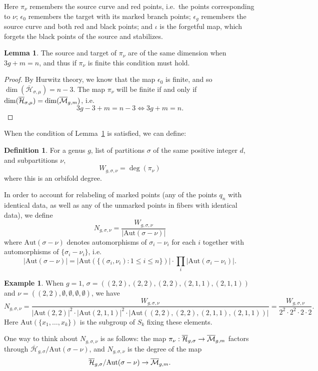 \documentclass[thesis]{thesis-umich}           %
\newcommand{\Aut}{\text{Aut}}
\newcommand{\Hb}{\overline{\mathcal H}}
\theoremstyle{definition}
\newtheorem{dfn}[thm]{Definition}
\newtheorem{lem}[thm]{Lemma}
\newtheorem{eg}[thm]{Example}
\begin{document}
Here $\pi_{\nu}$ remembers the source curve and red points, i.e.\ the points corresponding to $\nu$; $\epsilon_0$ remembers the target with its marked
branch points; $\epsilon_g$ remembers the source curve and both red
and black points; and $\iota$ is the forgetful map, which forgets
the black points of the source and stabilizes.

\begin{lem}
  \label{lem:dim}
  The source and target of $\pi_{\nu}$ are of the same dimension when $3g+m=n$,
  and thus if $\pi_{\nu}$ is finite this condition must hold.
\end{lem}
\begin{proof}
  By Hurwitz theory, we know that the map $\epsilon_0$ is finite, and so $\dim(\Hb_{\sigma,\mu})=n-3$. The map $\pi_{\nu}$ will be finite if and only if
  $\dim(\Hb_{\sigma,\mu})=\dim(\mb_{g,m})$, i.e.
  \[
  3g-3+m=n-3\iff 3g+m=n.
  \]
  \end{proof}

When the condition of Lemma~\ref{lem:dim} is satisfied, we can define:
\begin{dfn}
  For a genus $g$, list of partitions $\sigma$ of the
  same positive integer $d$, and subpartitions $\nu$,
\[
W_{g,\sigma,\nu}=\deg(\pi_{\nu})
\]
where this is an orbifold degree.
\end{dfn}
In order to account for relabeling of marked points (any of the points $q_n$ with identical data, as well as any of the unmarked points in fibers with
identical data), we define
\[
N_{g,\sigma,\nu}=\frac{W_{g,\sigma,\nu}}{|\Aut(\sigma-\nu)|}
\]
where $\Aut(\sigma-\nu)$ denotes automorphisms of $\sigma_i-\nu_i$ for each $i$ together with automorphisms of $\{\sigma_i-\nu_i\}$, i.e.
\[
|\Aut(\sigma-\nu)|=|\Aut(\{(\sigma_i,\nu_i):1\leq i\leq n\})|\cdot \prod_i|\Aut(\sigma_i-\nu_i)|.
\]
\begin{eg}
  When $g=1$, $\sigma=((2,2),(2,2),(2,2),(2,1,1),(2,1,1))$ and $\nu=((2,2),\emptyset,\emptyset,\emptyset,\emptyset)$, we have
  \[
  N_{g,\sigma,\nu}=\frac{W_{g,\sigma,\nu}}{|\Aut(2,2)|^2\cdot |\Aut(2,1,1)|^2\cdot |\Aut((2,2),(2,2),(2,1,1),(2,1,1))|}=\frac{W_{g,\sigma,\nu}}{2^2\cdot 2^2\cdot 2\cdot 2}.
  \]
  Here $\Aut(\{x_1,\dots,x_k\})$ is the subgroup of $S_k$ fixing these elements.
  \end{eg}

One way to think about $N_{g,\sigma,\nu}$ is as follows: the map
$\pi_{\nu}:\Hb_{g,\sigma}\to\mb_{g,m}$ factors through
$\Hb_{g,\sigma}/\Aut(\sigma-\nu)$, and $N_{g,\sigma,\nu}$ is the degree of the map
\[
\Hb_{g,\sigma}/\Aut(\sigma-\nu)\to\mb_{g,m}.
\]
\end{document}
